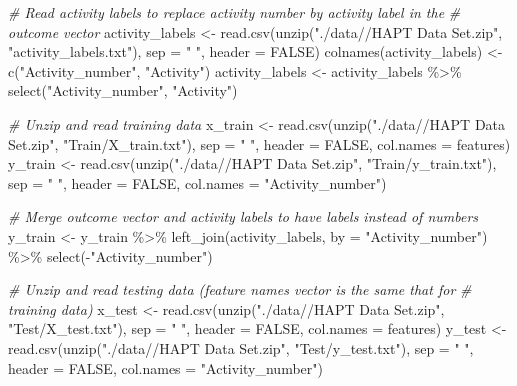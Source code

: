 \documentclass[
]{article}
\newenvironment{Shaded}{\begin{snugshade}}{\end{snugshade}}
\newcommand{\AttributeTok}[1]{\textcolor[rgb]{0.77,0.63,0.00}{#1}}
\newcommand{\CommentTok}[1]{\textcolor[rgb]{0.56,0.35,0.01}{\textit{#1}}}
\newcommand{\ConstantTok}[1]{\textcolor[rgb]{0.00,0.00,0.00}{#1}}
\newcommand{\FunctionTok}[1]{\textcolor[rgb]{0.00,0.00,0.00}{#1}}
\newcommand{\NormalTok}[1]{#1}
\newcommand{\OtherTok}[1]{\textcolor[rgb]{0.56,0.35,0.01}{#1}}
\newcommand{\SpecialCharTok}[1]{\textcolor[rgb]{0.00,0.00,0.00}{#1}}
\newcommand{\StringTok}[1]{\textcolor[rgb]{0.31,0.60,0.02}{#1}}
\begin{document}
\begin{Shaded}
\begin{Highlighting}[]
\CommentTok{\# Read activity labels to replace activity number by activity label in the}
\CommentTok{\# outcome vector}
\NormalTok{activity\_labels }\OtherTok{\textless{}{-}} \FunctionTok{read.csv}\NormalTok{(}\FunctionTok{unzip}\NormalTok{(}\StringTok{"./data//HAPT Data Set.zip"}\NormalTok{, }\StringTok{"activity\_labels.txt"}\NormalTok{),}
    \AttributeTok{sep =} \StringTok{" "}\NormalTok{, }\AttributeTok{header =} \ConstantTok{FALSE}\NormalTok{)}
\FunctionTok{colnames}\NormalTok{(activity\_labels) }\OtherTok{\textless{}{-}} \FunctionTok{c}\NormalTok{(}\StringTok{"Activity\_number"}\NormalTok{, }\StringTok{"Activity"}\NormalTok{)}
\NormalTok{activity\_labels }\OtherTok{\textless{}{-}}\NormalTok{ activity\_labels }\SpecialCharTok{\%\textgreater{}\%}
    \FunctionTok{select}\NormalTok{(}\StringTok{"Activity\_number"}\NormalTok{, }\StringTok{"Activity"}\NormalTok{)}

\CommentTok{\# Unzip and read training data}
\NormalTok{x\_train }\OtherTok{\textless{}{-}} \FunctionTok{read.csv}\NormalTok{(}\FunctionTok{unzip}\NormalTok{(}\StringTok{"./data//HAPT Data Set.zip"}\NormalTok{, }\StringTok{"Train/X\_train.txt"}\NormalTok{), }\AttributeTok{sep =} \StringTok{" "}\NormalTok{,}
    \AttributeTok{header =} \ConstantTok{FALSE}\NormalTok{, }\AttributeTok{col.names =}\NormalTok{ features)}
\NormalTok{y\_train }\OtherTok{\textless{}{-}} \FunctionTok{read.csv}\NormalTok{(}\FunctionTok{unzip}\NormalTok{(}\StringTok{"./data//HAPT Data Set.zip"}\NormalTok{, }\StringTok{"Train/y\_train.txt"}\NormalTok{), }\AttributeTok{sep =} \StringTok{" "}\NormalTok{,}
    \AttributeTok{header =} \ConstantTok{FALSE}\NormalTok{, }\AttributeTok{col.names =} \StringTok{"Activity\_number"}\NormalTok{)}

\CommentTok{\# Merge outcome vector and activity labels to have labels instead of numbers}
\NormalTok{y\_train }\OtherTok{\textless{}{-}}\NormalTok{ y\_train }\SpecialCharTok{\%\textgreater{}\%}
    \FunctionTok{left\_join}\NormalTok{(activity\_labels, }\AttributeTok{by =} \StringTok{"Activity\_number"}\NormalTok{) }\SpecialCharTok{\%\textgreater{}\%}
    \FunctionTok{select}\NormalTok{(}\SpecialCharTok{{-}}\StringTok{"Activity\_number"}\NormalTok{)}


\CommentTok{\# Unzip and read testing data (feature names vector is the same that for}
\CommentTok{\# training data)}
\NormalTok{x\_test }\OtherTok{\textless{}{-}} \FunctionTok{read.csv}\NormalTok{(}\FunctionTok{unzip}\NormalTok{(}\StringTok{"./data//HAPT Data Set.zip"}\NormalTok{, }\StringTok{"Test/X\_test.txt"}\NormalTok{), }\AttributeTok{sep =} \StringTok{" "}\NormalTok{,}
    \AttributeTok{header =} \ConstantTok{FALSE}\NormalTok{, }\AttributeTok{col.names =}\NormalTok{ features)}
\NormalTok{y\_test }\OtherTok{\textless{}{-}} \FunctionTok{read.csv}\NormalTok{(}\FunctionTok{unzip}\NormalTok{(}\StringTok{"./data//HAPT Data Set.zip"}\NormalTok{, }\StringTok{"Test/y\_test.txt"}\NormalTok{), }\AttributeTok{sep =} \StringTok{" "}\NormalTok{,}
    \AttributeTok{header =} \ConstantTok{FALSE}\NormalTok{, }\AttributeTok{col.names =} \StringTok{"Activity\_number"}\NormalTok{)}


\end{Highlighting}
\end{Shaded}
\end{document}
